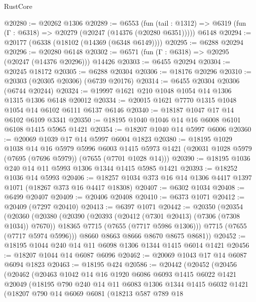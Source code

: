 \begin{lexlean}{RustCore}
\begin{coremodule}
@20280 := @20262 @1306
@20289 := @6553
    (fun (tail : @1312) => @6319 (fun (Γ : @6318) => @20279 (@20247 (@14376 (@20280 @6351)))))
    @6148
@20294 := @20177 (@6338 (@18102 (@14369 (@6348 @6149))))
@20295 := @6288 @20294
@20296 := @20280 @6148
@20302 := @6571 (fun (Γ : @6318) => @20295 (@20247 (@14376 @20296))) @14426
@20303 := @6455 @20294
@20304 := @20245 @18172
@20305 := @6288 @20304
@20306 := @18176 @20296
@20310 := @20303 (@20305 @20306) (@6739 @20176)
@20314 := @6455 @20304 @20306 (@6744 @20244)
@20324 := @19997 @1621 @210 @1048 @1054 @14 @1306 @1315 @1306 @6148 @20012
@20334 := @20015 @1621 @7770 @1315 @1048 @1054 @14 @6102 @6111 @6137 @6146
@20340 := @18187 @1047 @17 @14 @6102 @6109 @3341
@20350 := @18195 @1040 @1046 @14 @16 @6008 @6101 @6108 @1415 @5965 @1421
@20354 := @18207 @1040 @14 @5997 @6006
@20360 := @20069 @1039 @17 @14 @5997 @6004 @1823
@20380 := @18195
    @1029
    @1038
    @14
    @16
    @5979
    @5996
    @6003
    @1415
    @5973
    @1421
    (@20031 @1028 @5979 (@7695 (@7696 @5979)) (@7655 (@7701 @1028 @14)))
@20390 := @18195 @1036 @240 @14 @11 @5993 @1306 @1344 @1415 @5985 @1421
@20393 := @18252 @1036 @14 @5993
@20406 := @18257 @1034 @373 @16 @14 @1306 @4417 @1397 @1071 (@18267 @373 @16 @4417 @18308)
@20407 := @6302 @1034
@20408 := @6499 @20407
@20409 := @20406 @20408
@20410 := @6373 @1071
@20412 := @20409 (@7297 @20410)
@20413 := @6397 @1071
@20442 := @20350
    (@20354
      (@20360
        (@20380
          (@20390
            (@20393 (@20412 (@7301 @20413) (@7306 (@7308 @1034)) @7670))
            @18365
            @7715
            (@7655 (@7717 @5986 @1306)))
          @7715
          (@7655 (@7717 @5974 @5996)))
        @8660
        @8663
        @8666
        @8670
        @8675
        @8681))
@20452 := @18195 @1044 @240 @14 @11 @6098 @1306 @1344 @1415 @6014 @1421
@20456 := @18207 @1044 @14 @6087 @6096
@20462 := @20069 @1043 @17 @14 @6087 @6094 @1823
@20463 := @18195 @424
@20586 := @20442
    (@20452
      (@20456
        (@20462
          (@20463
            @1042
            @14
            @16
            @1920
            @6086
            @6093
            @1415
            @6022
            @1421
            @20049
            (@18195
              @790
              @240
              @14
              @11
              @6083
              @1306
              @1344
              @1415
              @6032
              @1421
              (@18207
                @790
                @14
                @6069
                @6081
                (@18213
                  @587
                  @789
                  @18

\end{coremodule}
\end{lexlean}
